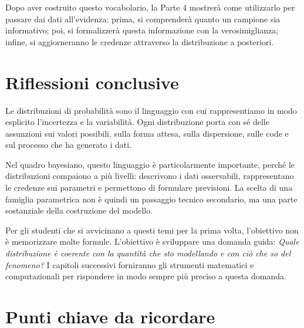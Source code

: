 \documentclass[
  italian,
  letterpaper,
  a4paper,
  11pt,
  open=any]{scrbook}
\theoremstyle{plain}
\theoremstyle{definition}
\theoremstyle{definition}
\theoremstyle{remark}
\begin{document}
Dopo aver costruito questo vocabolario, la Parte 4 mostrerà come
utilizzarlo per passare dai dati all'evidenza: prima, si comprenderà
quanto un campione sia informativo; poi, si formalizzerà questa
informazione con la verosimiglianza; infine, si aggiorneranno le
credenze attraverso la distribuzione a posteriori.

\section*{Riflessioni conclusive}\label{riflessioni-conclusive-9}


Le distribuzioni di probabilità sono il linguaggio con cui
rappresentiamo in modo esplicito l'incertezza e la variabilità. Ogni
distribuzione porta con sé delle assunzioni sui valori possibili, sulla
forma attesa, sulla dispersione, sulle code e sul processo che ha
generato i dati.

Nel quadro bayesiano, questo linguaggio è particolarmente importante,
perché le distribuzioni compaiono a più livelli: descrivono i dati
osservabili, rappresentano le credenze sui parametri e permettono di
formulare previsioni. La scelta di una famiglia parametrica non è quindi
un passaggio tecnico secondario, ma una parte sostanziale della
costruzione del modello.

Per gli studenti che si avvicinano a questi temi per la prima volta,
l'obiettivo non è memorizzare molte formule. L'obiettivo è sviluppare
una domanda guida: \emph{Quale distribuzione è coerente con la quantità
che sto modellando e con ciò che so del fenomeno?} I capitoli successivi
forniranno gli strumenti matematici e computazionali per rispondere in
modo sempre più preciso a questa domanda.

\section*{Punti chiave da ricordare}\label{punti-chiave-da-ricordare-9}

\end{document}
